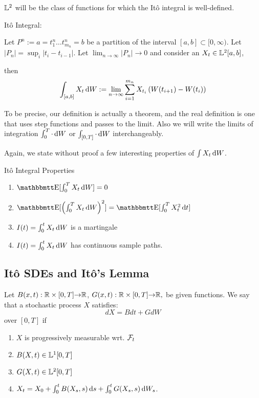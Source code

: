 ${\mathbb{L}^2}$ will be the class of functions for which the It\^o integral is
well-defined. 
\begin{defn} It\^o Integral:
\label{defn:ito_integral}

Let $P^n := {a = t^n_1 \ldots t^n_{m_n} = b}$ be a partition of the interval
$[a,b] \subset [0, \infty)$. Let $|P_n| = \sup_i|t_i - t_{i-1}|$. 
Let $ \lim_{n \rightarrow \infty} |P_n| \rightarrow 0 $ and consider an $ X_t
\in {\mathbb{L}^2}[a,b]$,

then
\begin{equation}
\int_{[a,b]} X_t \, \mathrm{d} W := \lim_{n \rightarrow \infty}  
\sum_{i=1}^{m_n} X_{t_i}\left( W(t_{i+1}) - W(t_{i})\right)
\end{equation}

\end{defn}

To be precise, our definition is actually a theorem, and the real
definition is one that uses step functions and passes to the limit.  Also we
will write the limits of integration $\int_0^T \cdot  \, \mathrm{d} W$ or $\int_{[0,T]}
\cdot  \, \mathrm{d} W$ interchangeably. 

Again, we state without proof a few interesting properties of $\int X_t
\, \mathrm{d} W$. \begin{thm} It\^o Integral Properties

\begin{enumerate}
  \item $\Exp[\int_0^T X_t \intd{W} ] = 0$ 
  \item $\Exp[\left(\int_0^T X_t \intd{W}\right)^2 ] = \Exp[\int_0^T X_t^2
  \intd{t}]$
  \item $I(t) = \int_0^t X_t \, \mathrm{d} W $ is a martingale 
  \item $I(t) = \int_0^t X_t \, \mathrm{d} W $ has continuous sample paths.
\end{enumerate}
\end{thm}

\subsection{It\^o SDEs and It\^o's Lemma}
\begin{defn}[It\^o SDE] Let
$B(x,t):{ \mathbb{R} }\times [0,T]{\rightarrow} { \mathbb{R} }$, $G(x,t):{ \mathbb{R} }\times [0,T]{\rightarrow} { \mathbb{R} },$ be given
functions. We say that a stochastic process $X$ satisfies:
\begin{equation}
dX =B dt + G dW
\end{equation} 
over $[0,T]$ if
\begin{enumerate}
  \item $X$ is progressively measurable wrt. ${\mathcal{F}}_t$
  \item $B(X,t) \in {\mathbb{L}^1}[0,T]$
  \item $G(X,t) \in {\mathbb{L}^2}[0,T]$ 
  \item $X_t = X_0 + \int_0^t B(X_s, s) \, \mathrm{d} s + \int_0^t G(X_s, s) \, \mathrm{d} W_s$.
\end{enumerate}
\end{defn}  

